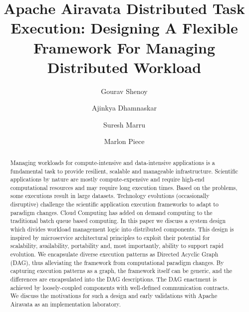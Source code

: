 \documentclass[sigconf]{acmart}
\begin{document}
\title{Apache Airavata Distributed Task Execution: Designing A Flexible Framework For Managing Distributed Workload}

\author{Gourav Shenoy}

\author{Ajinkya Dhamnaskar}

\author{Suresh Marru}

\author{Marlon Piece}

\begin{abstract}
Managing workloads for compute-intensive and data-intensive applications is a fundamental task to provide resilient, scalable and manageable infrastructure. Scientific applications by nature are mostly compute-expensive and require high-end computational resources and may require long execution times. Based on the problems, some executions result in large datasets. Technology evolutions (occasionally disruptive) challenge the scientific application execution frameworks to adapt to paradigm changes. Cloud Computing has added on demand computing to the traditional batch queue based computing. In this paper we discuss a system design which divides workload management logic into distributed components. This design is inspired by microservice architectural principles to exploit their potential for scalability, availability, portability and, most importantly, ability to support rapid evolution. We encapsulate diverse execution patterns as Directed Acyclic Graph (DAG), thus alleviating the framework from computational paradigm changes. By capturing execution patterns as a graph, the framework itself can be generic, and the differences are encapsulated into the DAG descriptions. The DAG enactment is achieved by loosely-coupled components with well-defined communication contracts. We discuss the motivations for such a design and early validations with Apache Airavata as an implementation laboratory.   
\end{abstract}
\end{document}
